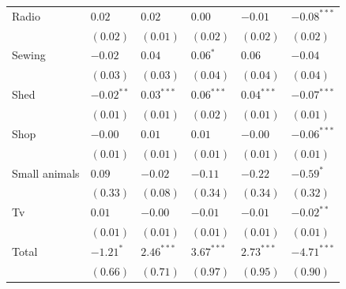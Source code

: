 \documentclass[11pt]{article}
\begin{document}
\begin{table}[htb]
\begin{tabular}{llllll}
Radio & $0.02$ & $0.02$ & $0.00$ & $-0.01$ & $-0.08^{***}$\\
 & $(0.02)$ & $(0.01)$ & $(0.02)$ & $(0.02)$ & $(0.02)$\\
Sewing & $-0.02$ & $0.04$ & $0.06^{*}$ & $0.06$ & $-0.04$\\
 & $(0.03)$ & $(0.03)$ & $(0.04)$ & $(0.04)$ & $(0.04)$\\
Shed & $-0.02^{**}$ & $0.03^{***}$ & $0.06^{***}$ & $0.04^{***}$ & $-0.07^{***}$\\
 & $(0.01)$ & $(0.01)$ & $(0.02)$ & $(0.01)$ & $(0.01)$\\
Shop & $-0.00$ & $0.01$ & $0.01$ & $-0.00$ & $-0.06^{***}$\\
 & $(0.01)$ & $(0.01)$ & $(0.01)$ & $(0.01)$ & $(0.01)$\\
Small animals & $0.09$ & $-0.02$ & $-0.11$ & $-0.22$ & $-0.59^{*}$\\
 & $(0.33)$ & $(0.08)$ & $(0.34)$ & $(0.34)$ & $(0.32)$\\
Tv & $0.01$ & $-0.00$ & $-0.01$ & $-0.01$ & $-0.02^{**}$\\
 & $(0.01)$ & $(0.01)$ & $(0.01)$ & $(0.01)$ & $(0.01)$\\
\hline
Total & $-1.21^{*}$ & $2.46^{***}$ & $3.67^{***}$ & $2.73^{***}$ & $-4.71^{***}$\\
 & $(0.66)$ & $(0.71)$ & $(0.97)$ & $(0.95)$ & $(0.90)$\\
\end{tabular}
\end{table}
\end{document}
